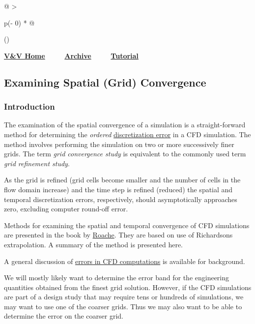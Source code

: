 \begin{longtable}[]{@{}
  >{\raggedright\arraybackslash}p{(\columnwidth - 0\tabcolsep) * }@{}}
\toprule()
\endhead
\begin{minipage}[t]{\linewidth}\raggedright
\href{https://www.grc.nasa.gov/www/wind/valid/homepage.html}{\textbf{V\&V
Home}} ~ ~ ~
\href{https://www.grc.nasa.gov/www/wind/valid/archive.html}{\textbf{Archive}}
~ ~ ~
\href{https://www.grc.nasa.gov/www/wind/valid/tutorial/tutorial.html}{\textbf{Tutorial}}

\hypertarget{examining-spatial-grid-convergence}{%
\subsection{Examining Spatial (Grid)
Convergence}\label{examining-spatial-grid-convergence}}

\hypertarget{introduction}{%
\subsubsection{Introduction}\label{introduction}}

The examination of the spatial convergence of a simulation is a
straight-forward method for determining the \emph{ordered}
\href{https://www.grc.nasa.gov/www/wind/valid/tutorial/errors.html}{discretization
error} in a CFD simulation. The method involves performing the
simulation on two or more successively finer grids. The term \emph{grid
convergence study} is equivalent to the commonly used term \emph{grid
refinement study}.

As the grid is refined (grid cells become smaller and the number of
cells in the flow domain increase) and the time step is refined
(reduced) the spatial and temporal discretization errors, respectively,
should asymptotically approaches zero, excluding computer round-off
error.

Methods for examining the spatial and temporal convergence of CFD
simulations are presented in the book by
\href{https://www.grc.nasa.gov/www/wind/valid/tutorial/bibliog.html\#Roach94}{Roache}.
They are based on use of Richardson\textquotesingle s extrapolation. A
summary of the method is presented here.

A general discussion of
\href{https://www.grc.nasa.gov/www/wind/valid/tutorial/errors.html}{errors
in CFD computations} is available for background.

We will mostly likely want to determine the error band for the
engineering quantities obtained from the finest grid solution. However,
if the CFD simulations are part of a design study that may require tens
or hundreds of simulations, we may want to use one of the coarser grids.
Thus we may also want to be able to determine the error on the coarser
grid.


\end{minipage}
\end{longtable}
